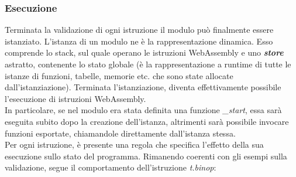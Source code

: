 \subsubsection{Esecuzione}
Terminata la validazione di ogni istruzione il modulo può finalmente essere istanziato.
L'istanza di un modulo ne è la rappresentazione dinamica. Esso comprende lo stack, sul quale operano le istruzioni WebAssembly e uno \emph{\textbf{store}} astratto, contenente lo stato globale (è la rappresentazione a runtime di tutte le istanze di funzioni, tabelle, memorie etc. che sono state allocate dall'istanziazione).
Terminata l'istanziazione, diventa effettivamente possibile l'esecuzione di istruzioni WebAssembly.
\\In particolare, se nel modulo era stata definita una funzione \emph{\_start}, essa sarà eseguita subito dopo la creazione dell'istanza, altrimenti sarà possibile invocare funzioni esportate, chiamandole direttamente dall'istanza stessa.
\\Per ogni istruzione, è presente una regola che specifica l'effetto della sua esecuzione sullo stato del programma. Rimanendo coerenti con gli esempi sulla validazione, segue il comportamento dell'istruzione \emph{t.binop}:

